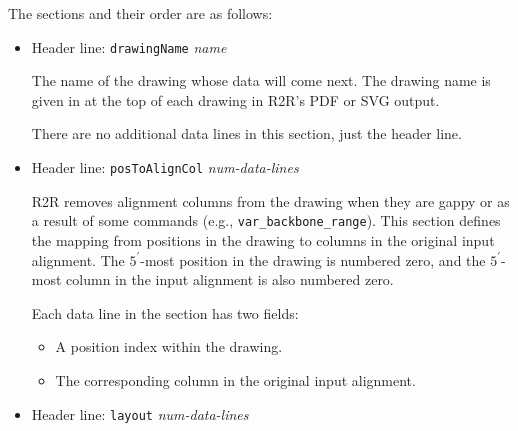 \documentclass[letterpaper,12pt]{report}
\begin{document}
The sections and their order are as follows:
\begin{itemize}
\item Header line: {\tt drawingName} {\it name}

The name of the drawing whose data will come next.  The drawing name is given in at the top of each drawing in R2R's PDF or SVG output.

There are no additional data lines in this section, just the header line.
\item Header line: {\tt posToAlignCol} {\it num-data-lines}

R2R removes alignment columns from the drawing when they are gappy or as a result of some commands (e.g., {\tt var\_backbone\_range}).  This section defines the mapping from positions in the drawing to columns in the original input alignment.  The $5^\prime$-most position in the drawing is numbered zero, and the $5^\prime$-most column in the input alignment is also numbered zero.

Each data line in the section has two fields:
\begin{itemize}
\item A position index within the drawing.
\item The corresponding column in the original input alignment.
\end{itemize}
\item Header line: {\tt layout} {\it num-data-lines}


\end{itemize}
\end{document}
